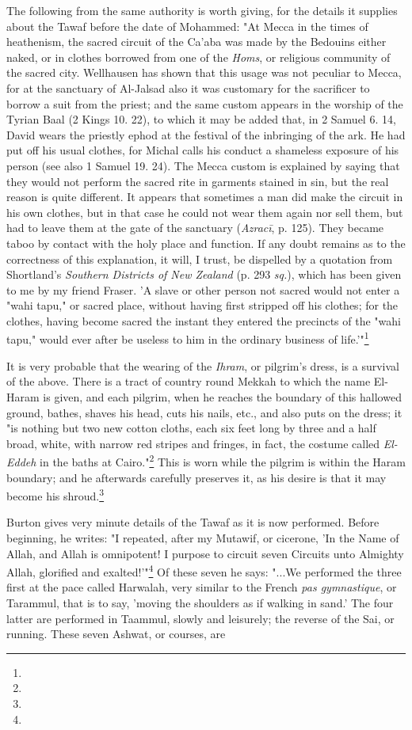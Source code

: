 \documentclass[a4paper, 11pt, oneside, polutonikogreek, english]{article}
\begin{document}
The following from the same authority is worth giving, for the details it supplies about the Tawaf before the date of Mohammed: "At Mecca in the times of heathenism, the sacred circuit of the Ca'aba was made by the Bedouins either naked, or in clothes borrowed from one of the \emph{Homs}, or religious community of the sacred city. Wellhausen has shown that this usage was not peculiar to Mecca, for at the sanctuary of Al-Jalsad also it was customary for the sacrificer to borrow a suit from the priest; and the same custom appears in the worship of the Tyrian Baal (2 Kings 10. 22), to which it may be added that, in 2 Samuel 6. 14, David wears the priestly ephod at the festival of the inbringing of the ark. He had put off his usual clothes, for Michal calls his conduct a shameless exposure of his person (see also 1 Samuel 19. 24). The Mecca custom is explained by saying that they would not perform the sacred rite in garments stained in sin, but the real reason is quite different. It appears that sometimes a man did make the circuit in his own clothes, but in that case he could not wear them again nor sell them, but had to leave them at the gate of the sanctuary (\emph{Azracī}, p. 125). They became taboo by contact with the holy place and function. If any doubt remains as to the correctness of this explanation, it will, I trust, be dispelled by a quotation from Shortland's \emph{Southern Districts of New Zealand} (p. 293 \emph{sq.}), which has been given to me by my friend Fraser. 'A slave or other person not sacred would not enter a "wahi tapu," or sacred place, without having first stripped off his clothes; for the clothes, having become sacred the instant they entered the precincts of the "wahi tapu," would ever after be useless to him in the ordinary business of life.'"\footnote{}

It is very probable that the wearing of the \emph{Ihram}, or pilgrim's dress, is a survival of the above. There is a tract of country round Mekkah to which the name El-Haram is given, and each pilgrim, when he reaches the boundary of this hallowed ground, bathes, shaves his head, cuts his nails, etc., and also puts on the dress; it "is nothing but two new cotton cloths, each six feet long by three and a half broad, white, with narrow red stripes and fringes, in fact, the costume called \emph{El-Eddeh} in the baths at Cairo."\footnote{} This is worn while the pilgrim is within the Haram boundary; and he afterwards carefully preserves it, as his desire is that it may become his shroud.\footnote{}

Burton gives very minute details of the Tawaf as 
it is now performed. Before beginning, he writes: 
"I repeated, after my Mutawif, or cicerone, 'In the 
Name of Allah, and Allah is omnipotent! I purpose to 
circuit seven Circuits unto Almighty Allah, glorified 
and exalted!'"\footnote{} Of these seven he says: "...We 
performed the three first at the pace called Harwalah, 
very similar to the French \emph{pas gymnastique}, or 
Tarammul, that is to say, 'moving the shoulders as if 
walking in sand.' The four latter are performed in 
Taammul, slowly and leisurely; the reverse of the 
Sai, or running. These seven Ashwat, or courses, are 
\end{document}
